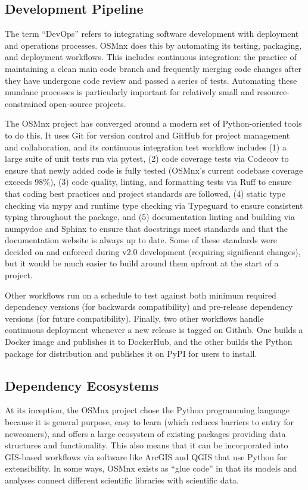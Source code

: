 \documentclass[12pt,letterpaper]{article} %
\begin{document}
\subsection{Development Pipeline}

The term \enquote{DevOps} refers to integrating software development with deployment and operations processes. OSMnx does this by automating its testing, packaging, and deployment workflows. This includes continuous integration: the practice of maintaining a clean main code branch and frequently merging code changes after they have undergone code review and passed a series of tests. Automating these mundane processes is particularly important for relatively small and resource-constrained open-source projects.

The OSMnx project has converged around a modern set of Python-oriented tools to do this. It uses Git for version control and GitHub for project management and collaboration, and its continuous integration test workflow includes (1) a large suite of unit tests run via pytest, (2) code coverage tests via Codecov to ensure that newly added code is fully tested (OSMnx's current codebase coverage exceeds 98\%), (3) code quality, linting, and formatting tests via Ruff to ensure that coding best practices and project standards are followed, (4) static type checking via mypy and runtime type checking via Typeguard to ensure consistent typing throughout the package, and (5) documentation linting and building via numpydoc and Sphinx to ensure that docstrings meet standards and that the documentation website is always up to date. Some of these standards were decided on and enforced during v2.0 development (requiring significant changes), but it would be much easier to build around them upfront at the start of a project.

Other workflows run on a schedule to test against both minimum required dependency versions (for backwards compatibility) and pre-release dependency versions (for future compatibility). Finally, two other workflows handle continuous deployment whenever a new release is tagged on Github. One builds a Docker image and publishes it to DockerHub, and the other builds the Python package for distribution and publishes it on PyPI for users to install.

\subsection{Dependency Ecosystems}

At its inception, the OSMnx project chose the Python programming language because it is general purpose, easy to learn (which reduces barriers to entry for newcomers), and offers a large ecosystem of existing packages providing data structures and functionality. This also means that it can be incorporated into GIS-based workflows via software like ArcGIS and QGIS that use Python for extensibility. In some ways, OSMnx exists as \enquote{glue code} in that its models and analyses connect different scientific libraries with scientific data.
\end{document}
